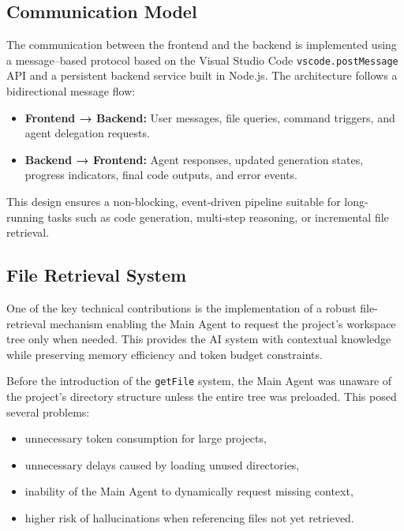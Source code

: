 \documentclass[12pt,a4paper]{article}
\begin{document}
\subsection{Communication Model}

The communication between the frontend and the backend is implemented using a message–based protocol based on the Visual Studio Code \texttt{vscode.postMessage} API and a persistent backend service built in Node.js. The architecture follows a bidirectional message flow:

\begin{itemize}
    \item \textbf{Frontend → Backend:} User messages, file queries, command triggers, and agent delegation requests.
    \item \textbf{Backend → Frontend:} Agent responses, updated generation states, progress indicators, final code outputs, and error events.
\end{itemize}

This design ensures a non-blocking, event-driven pipeline suitable for long-running tasks such as code generation, multi-step reasoning, or incremental file retrieval.

\subsection{File Retrieval System}
One of the key technical contributions is the implementation of a robust file-retrieval mechanism 
enabling the Main Agent to request the project’s workspace tree only when needed. This provides the 
AI system with contextual knowledge while preserving memory efficiency and token budget constraints. 
\newline

Before the introduction of the \texttt{getFile} system, the Main Agent was unaware of the project’s 
directory structure unless the entire tree was preloaded. This posed several problems:

\begin{itemize}
    \item unnecessary token consumption for large projects,
    \item unnecessary delays caused by loading unused directories,
    \item inability of the Main Agent to dynamically request missing context,
    \item higher risk of hallucinations when referencing files not yet retrieved.
\end{itemize}
\end{document}
